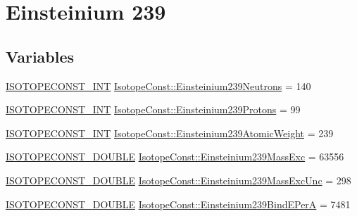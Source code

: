 \hypertarget{group___isotope_const-_einsteinium-_es239}{}\section{Einsteinium 239}
\label{group___isotope_const-_einsteinium-_es239}
\subsection*{Variables}
\begin{DoxyCompactItemize}
\item 
\mbox{\hyperlink{group___isotope_const-_macros_ga5f18360b3e99483a35c32d789e62621c}{I\+S\+O\+T\+O\+P\+E\+C\+O\+N\+S\+T\+\_\+\+I\+NT}} \mbox{\hyperlink{group___isotope_const-_einsteinium-_es239_ga508761e3d87f94e89093b2006998a922}{Isotope\+Const\+::\+Einsteinium239\+Neutrons}} = 140
\item 
\mbox{\hyperlink{group___isotope_const-_macros_ga5f18360b3e99483a35c32d789e62621c}{I\+S\+O\+T\+O\+P\+E\+C\+O\+N\+S\+T\+\_\+\+I\+NT}} \mbox{\hyperlink{group___isotope_const-_einsteinium-_es239_ga8b52ec90ebca8e7748d8ba59749f8d4d}{Isotope\+Const\+::\+Einsteinium239\+Protons}} = 99
\item 
\mbox{\hyperlink{group___isotope_const-_macros_ga5f18360b3e99483a35c32d789e62621c}{I\+S\+O\+T\+O\+P\+E\+C\+O\+N\+S\+T\+\_\+\+I\+NT}} \mbox{\hyperlink{group___isotope_const-_einsteinium-_es239_gad4f7ed2dce673fab3153ec9b5596edca}{Isotope\+Const\+::\+Einsteinium239\+Atomic\+Weight}} = 239
\item 
\mbox{\hyperlink{group___isotope_const-_macros_ga8f45a7272ce02c0b4c65c44636ed719a}{I\+S\+O\+T\+O\+P\+E\+C\+O\+N\+S\+T\+\_\+\+D\+O\+U\+B\+LE}} \mbox{\hyperlink{group___isotope_const-_einsteinium-_es239_gafae2258f4bb67cee3b976cdb4d773bc5}{Isotope\+Const\+::\+Einsteinium239\+Mass\+Exc}} = 63556
\item 
\mbox{\hyperlink{group___isotope_const-_macros_ga8f45a7272ce02c0b4c65c44636ed719a}{I\+S\+O\+T\+O\+P\+E\+C\+O\+N\+S\+T\+\_\+\+D\+O\+U\+B\+LE}} \mbox{\hyperlink{group___isotope_const-_einsteinium-_es239_ga7c50b6843021e6f20bd4f8ac5c2fa7e6}{Isotope\+Const\+::\+Einsteinium239\+Mass\+Exc\+Unc}} = 298
\item 
\mbox{\hyperlink{group___isotope_const-_macros_ga8f45a7272ce02c0b4c65c44636ed719a}{I\+S\+O\+T\+O\+P\+E\+C\+O\+N\+S\+T\+\_\+\+D\+O\+U\+B\+LE}} \mbox{\hyperlink{group___isotope_const-_einsteinium-_es239_ga334ca9a2fffc1effb23484610b3b2e2d}{Isotope\+Const\+::\+Einsteinium239\+Bind\+E\+PerA}} = 7481
\item 

\end{DoxyCompactItemize}
